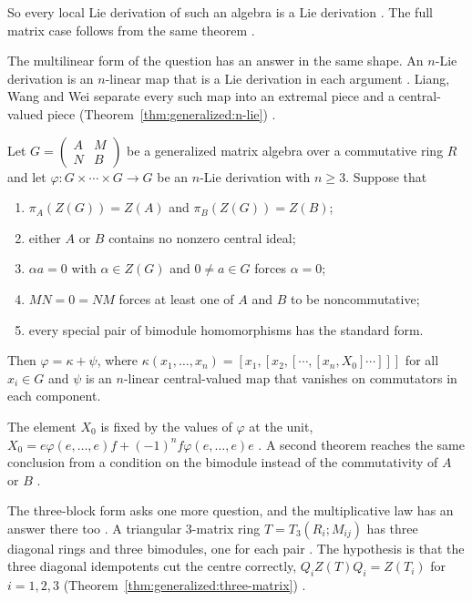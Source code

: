 So every local Lie derivation of such an algebra is a Lie derivation
\cite[p.~3]{Liu2021LocalLie}. The full matrix case follows from the same
theorem \cite[Theorem~3.1, p.~18]{Liu2021LocalLie}.

The multilinear form of the question has an answer in the same shape. An
$n$-Lie derivation is an $n$-linear map that is a Lie derivation in each
argument \cite[p.~1]{LiangWangWei2026}. Liang, Wang and Wei separate every such
map into an extremal piece and a central-valued piece (Theorem~\ref{thm:generalized:n-lie})
\cite[Theorem~4.1, p.~25]{LiangWangWei2026}.\begin{theorem}\label{thm:generalized:n-lie}
Let $G=\begin{pmatrix}A&M\\N&B\end{pmatrix}$ be a generalized matrix algebra
over a commutative ring $R$ and let $\varphi\colon G\times\cdots\times G\to G$
be an $n$-Lie derivation with $n\geq3$. Suppose that
\begin{enumerate}
\item $\pi_A(Z(G))=Z(A)$ and $\pi_B(Z(G))=Z(B)$;
\item either $A$ or $B$ contains no nonzero central ideal;
\item $\alpha a=0$ with $\alpha\in Z(G)$ and $0\neq a\in G$ forces $\alpha=0$;
\item $MN=0=NM$ forces at least one of $A$ and $B$ to be noncommutative;
\item every special pair of bimodule homomorphisms has the standard form.
\end{enumerate}
Then $\varphi=\kappa+\psi$, where
$\kappa(x_1,\dots,x_n)=[x_1,[x_2,[\cdots,[x_n,X_0]\cdots]]]$ for all
$x_i\in G$ and $\psi$ is an $n$-linear central-valued map that vanishes on
commutators in each component.
\end{theorem}

The element $X_0$ is fixed by the values of $\varphi$ at the unit,
$X_0=e\varphi(e,\dots,e)f+(-1)^{n}f\varphi(e,\dots,e)e$
\cite[p.~2]{LiangWangWei2026}. A second theorem reaches the same conclusion from
a condition on the bimodule instead of the commutativity of $A$ or $B$
\cite[Theorem~4.3, p.~28]{LiangWangWei2026}.

The three-block form asks one more question, and the multiplicative law has an
answer there too \cite[Theorem~2.2, p.~5]{ChenHou2020}. A triangular $3$-matrix
ring $T=T_3(R_i;M_{ij})$ has three diagonal rings and three bimodules, one for
each pair \cite[p.~2]{ChenHou2020}. The hypothesis is that the three diagonal
idempotents cut the centre correctly,
$Q_iZ(T)Q_i=Z(T_i)$ for $i=1,2,3$ (Theorem~\ref{thm:generalized:three-matrix}) \cite[Theorem~2.2, p.~5]{ChenHou2020}.

